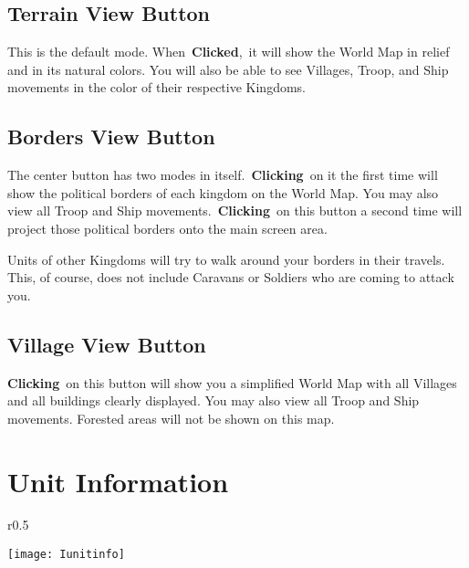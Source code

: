 \subsection{Terrain View Button}


This is the default mode. When \textbf{Clicked}, it will show the World Map in relief and in its natural colors. You will also be able to see Villages, Troop, and Ship movements in the color of their respective Kingdoms.

\subsection{Borders View Button}


The center button has two modes in itself. \textbf{Clicking} on it the first time will show the political borders of each kingdom on the World Map. You may also view all Troop and Ship movements. \textbf{Clicking} on this button a second time will project those political borders onto the main screen area.

Units of other Kingdoms will try to walk around your borders in their travels. This, of course, does not include Caravans or Soldiers who are coming to attack you.

\subsection{Village View Button}


\textbf{Clicking} on this button will show you a simplified World Map with all Villages and all buildings clearly displayed. You may also view all Troop and Ship movements. Forested areas will not be shown on this map.

\section{Unit Information}

\begin{wrapfigure}{r}{0.5\textwidth}
	\vspace{-20pt}
	\begin{center}
		\texttt{[image: Iunitinfo]}
	\end{center}
	\vspace{-20pt}
\end{wrapfigure}

